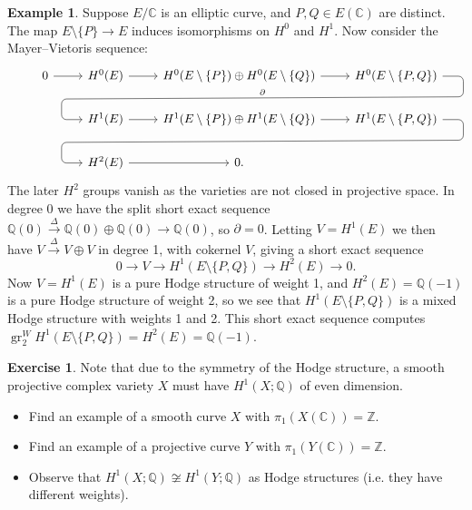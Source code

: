 \documentclass{article}
\theoremstyle{definition}
\newtheorem*{example}{Example}
\newtheorem*{exercise}{Exercise}
\DeclareMathOperator{\gr}{gr}
\newcommand{\Z}{\mathbb{Z}}
\newcommand{\Q}{\mathbb{Q}}
\newcommand{\C}{\mathbb{C}}
\begin{document}
\begin{example}
    Suppose $E/\C$ is an elliptic curve, and $P,Q\in E(\C)$ are distinct. The
    map $E\setminus\{P\}\to E$ induces isomorphisms on $H^0$ and $H^1$. Now
    consider the Mayer--Vietoris sequence:
    \begin{equation*}
        \begin{tikzcd}
            &0 \ar[r] &H^0(E) \ar[r]
            &H^0(E\setminus\{P\})\oplus H^0(E\setminus\{Q\}) \ar[r]
            &H^0(E\setminus\{P,Q\})
                \ar[sloped,rounded corners,dll,"\partial",to path={
                    -| ([yshift=-.6cm,xshift=.6cm]\tikztostart.east)
                    -- ([yshift=.6cm,xshift=-.6cm]\tikztotarget.west)
                    \tikztonodes
                    |- (\tikztotarget)
                }] \\
            & &H^1(E) \ar[r]
            &H^1(E\setminus\{P\})\oplus H^1(E\setminus\{Q\}) \ar[r]
            &H^1(E\setminus\{P,Q\})
                \ar[sloped,rounded corners,dll,to path={
                    -| ([yshift=-.6cm,xshift=.6cm]\tikztostart.east)
                    -- ([yshift=.6cm,xshift=-.6cm]\tikztotarget.west)
                    \tikztonodes
                    |- (\tikztotarget)
                }] \\
            & &H^2(E) \ar[r] &0.
        \end{tikzcd}
    \end{equation*}
    The later $H^2$ groups vanish as the varieties are not closed in projective
    space. In degree 0 we have the split short exact sequence
    $\Q(0)\xrightarrow\Delta\Q(0)\oplus\Q(0)\to\Q(0)$, so $\partial=0$. Letting
    $V=H^1(E)$ we then have $V\xrightarrow\Delta V\oplus V$ in degree 1, with
    cokernel $V$, giving a short exact sequence
    \begin{equation*}
        0 \to V \to H^1(E\setminus\{P,Q\}) \to H^2(E) \to 0.
    \end{equation*}
    Now $V=H^1(E)$ is a pure Hodge structure of weight 1, and $H^2(E)=\Q(-1)$
    is a pure Hodge structure of weight 2, so we see that
    $H^1(E\setminus\{P,Q\})$ is a mixed Hodge structure with weights 1 and 2.
    This short exact sequence computes
    $\gr^W_2H^1(E\setminus\{P,Q\})=H^2(E)=\Q(-1)$.
\end{example}

\begin{exercise}
    Note that due to the symmetry of the Hodge structure, a smooth projective
    complex variety $X$ must have $H^1(X;\Q)$ of even dimension.
    \begin{itemize}
        \item Find an example of a smooth curve $X$ with $\pi_1(X(\C))=\Z$.
        \item Find an example of a projective curve $Y$ with $\pi_1(Y(\C))=\Z$.
        \item Observe that $H^1(X;\Q)\not\cong H^1(Y;\Q)$ as Hodge structures
            (i.e. they have different weights).
    \end{itemize}
\end{exercise}
\end{document}
